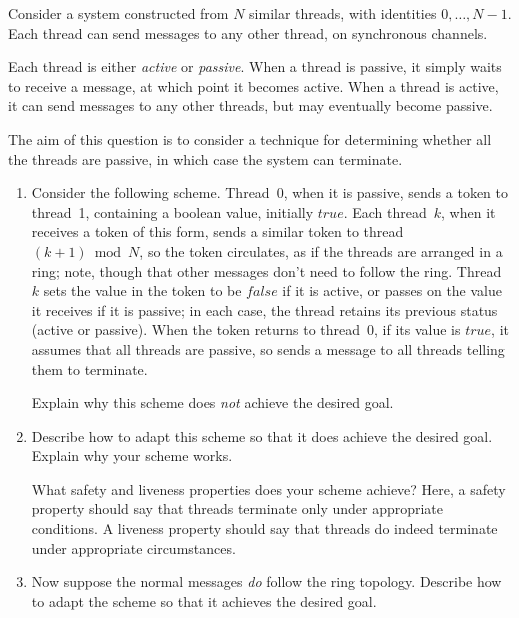\begin{question}
Consider a system constructed from $N$ similar threads, with identities
$0, \ldots, N-1$.  Each thread can send messages to any other thread, on
synchronous channels.

Each thread is either \emph{active} or \emph{passive}.  When a thread is
passive, it simply waits to receive a message, at which point it becomes
active.  When a thread is active, it can send messages to any other
threads, but may eventually become passive.

The aim of this question is to consider a technique for determining whether
all the threads are passive, in which case the system can terminate.

\begin{enumerate}
\item Consider the following scheme.  Thread~$0$, when it is passive, sends a
token to thread~1, containing a boolean value, initially $true$.  Each
thread~$k$, when it receives a token of this form, sends a similar token to
thread~$(k+1) \bmod N$, so the token circulates, as if the threads are
arranged in a ring; note, though that other messages don't need to follow the
ring.  Thread~$k$ sets the value in the token to be $false$ if it is active,
or passes on the value it receives if it is passive; in each case, the thread
retains its previous status (active or passive).  When the token returns to
thread~$0$, if its value is $true$, it assumes that all threads are passive,
so sends a message to all threads telling them to terminate.

Explain why this scheme does \emph{not} achieve the desired goal.


\item
Describe how to adapt this scheme so that it does achieve the desired goal.
Explain why your scheme works.  

What safety and liveness properties does your scheme achieve?  Here, a safety
property should say that threads terminate only under appropriate conditions.
A liveness property should say that threads do indeed terminate under
appropriate circumstances.


\item
Now suppose the normal messages \emph{do} follow the ring topology.  Describe
how to adapt the scheme so that it achieves the desired goal.

\end{enumerate}
\end{question}


